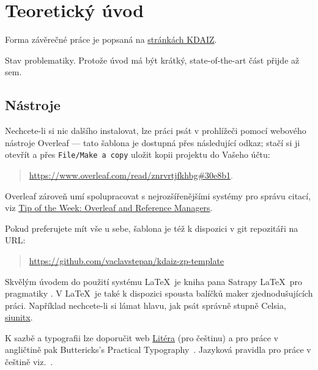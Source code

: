 \chapter{Teoretický úvod}
\label{sec:teorie}

\noindent Forma závěrečné práce je popsaná na \href{ https://kdaiz.fjfi.cvut.cz/studium/bakalarske-studium/bakalarska-prace/}{stránkách KDAIZ}.

Stav problematiky. Protože úvod má být krátký, state-of-the-art část přijde až sem.

\section{Nástroje}
\label{sec:nastroje}

\noindent Nechcete-li si nic dalšího instalovat, lze práci psát v prohlížeči pomocí webového nástroje Overleaf --- tato šablona je dostupná přes následující odkaz; stačí si ji otevřít a přes \texttt{File/Make a copy} uložit kopii projektu do Vašeho účtu:

\begin{quotation}
\href{https://www.overleaf.com/read/znrvrtjfkhbg#30e8b1}{https://www.overleaf.com/read/znrvrtjfkhbg\#30e8b1}. 
\end{quotation}

Overleaf zároveň umí spolupracovat s nejrozšířenějšími systémy pro správu citací, viz \href{https://www.overleaf.com/blog/639-tip-of-the-week-overleaf-and-reference-managers}{Tip of the Week: Overleaf and Reference Managers}. 

Pokud preferujete mít vše u sebe, šablona je též k dispozici v git repozitáři na URL:

\begin{quotation}
    \href{https://github.com/vaclavstepan/kdaiz-zp-template}{https://github.com/vaclavstepan/kdaiz-zp-template}
\end{quotation}

Skvělým úvodem do použití systému \LaTeX\ je kniha pana Satrapy \LaTeX\ pro pragmatiky \cite{satrapa_latex_2011}. V \LaTeX\ je také k dispozici spousta balíčků maker zjednodušujících práci. Například nechcete-li si lámat hlavu, jak psát správně stupně Celsia,  \href{https://texdoc.org/serve/siunitx/0}{siunitx}.

K sazbě a typografii lze doporučit web \href{http://www.liteera.cz}{Litéra} (pro češtinu) a pro práce v angličtině pak Buttericks's Practical Typography~\cite{butterick_matthew_buttericks_nodate}. 
Jazyková pravidla pro práce v češtině viz.~\cite{ijp}.

